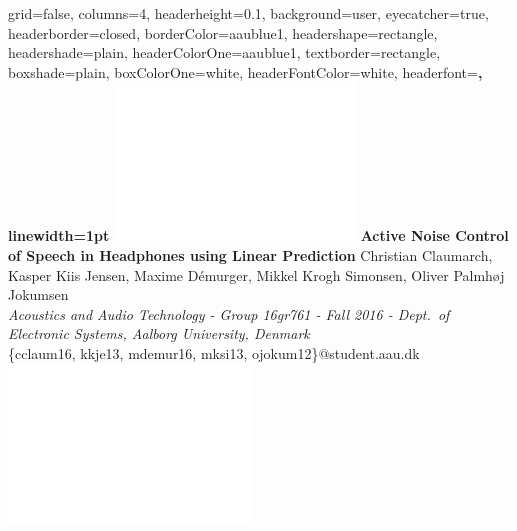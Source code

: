 \documentclass[a0paper,landscape]{baposter}
\begin{document}
\begin{poster}{
  grid=false,
  columns=4,
  headerheight=0.1\textheight,
  background=user,
  eyecatcher=true,
  headerborder=closed,
  borderColor=aaublue1,
  headershape=rectangle,
  headershade=plain,
  headerColorOne=aaublue1,
  textborder=rectangle,
  boxshade=plain,
  boxColorOne=white,
  headerFontColor=white,
  headerfont=\Large\sf\bf,
  linewidth=1pt
}
{
  \includegraphics[height=0.75\headerheight]{aau_logo_new_neg}
}
{\color{white}\bf
  Active Noise Control of Speech in Headphones using Linear Prediction
}
{\color{white}\small 
	\vspace{-3mm}Christian Claumarch, Kasper Kiis Jensen, Maxime Démurger, Mikkel Krogh Simonsen, Oliver Palmhøj Jokumsen \\
  \textit{Acoustics and Audio Technology - Group 16gr761 - Fall 2016 - Dept.\ of Electronic Systems, Aalborg University, Denmark}\\
  \{cclaum16, kkje13, mdemur16, mksi13, ojokum12\}@student.aau.dk
}
{
  \includegraphics[height=0.75\headerheight]{aau_logo_new_neg}
}


\end{poster}
\end{document}
